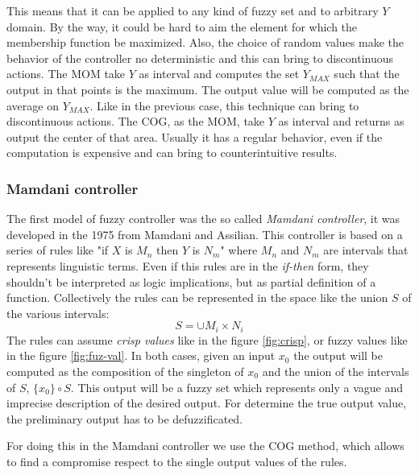 \documentclass{article}
\begin{document}
This means that it can be applied to any kind of fuzzy set and to arbitrary $Y$ domain. By the
way, it could be hard to aim the element for which the membership function be maximized. Also,
the choice of random values make the behavior of the controller no deterministic and
this can bring to discontinuous actions. The MOM take $Y$ as interval and computes the
set $Y_{MAX}$ such that the output in that points is the maximum. The output value will be computed
as the average on $Y_{MAX}$. Like in the previous case, this technique can bring to discontinuous
actions. The COG, as the MOM, take $Y$ as interval and returns as output the center of that area.
Usually it has a regular behavior, even if the computation is expensive and can bring to
counterintuitive results.

\subsubsection{Mamdani controller}
The first model of fuzzy controller was the so called \textit{Mamdani controller},
it was developed in the 1975 from Mamdani and Assilian. This controller is based on a
series of rules like "if $X$ is $M_n$ then $Y$ is $N_m$" where $M_n$ and $N_m$ are
intervals that represents linguistic terms. Even if this rules are in the \textit{if-then}
form, they shouldn't be interpreted as logic implications, but as partial definition
of a function. Collectively the rules can be represented in the space like the union
$S$ of the various intervals:
$$S=\cup M_i\times N_i$$
The rules can assume \textit{crisp values} like in the figure \ref{fig:crisp}, or
fuzzy values like in the figure \ref{fig:fuz-val}. In both cases, given an input $x_0$
the output will be computed as the composition of the singleton of $x_0$ and the
union of the intervals of $S$, $\{x_0\}\circ S$. This output will be a fuzzy set
which represents only a vague and imprecise description of the desired output. For
determine the true output value, the preliminary output has to be defuzzificated.

For doing this in the Mamdani controller we use the COG method, which allows to find a
compromise respect to the single output values of the rules.
\end{document}
